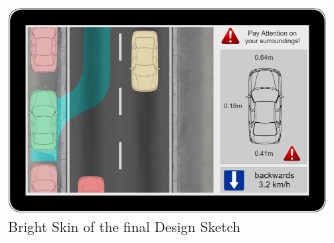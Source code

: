 \begin{figure}
\centering
\captionsetup{justification=centering}
\includegraphics[width=0.75\textwidth]{res/systemAnalysis/brightskin.png}
\caption{Bright Skin of the final Design Sketch}
\label{fig:brightskin}
\end{figure}
